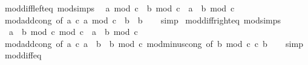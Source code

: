 \begin{isabellebody}
\ mod{\isacharunderscore}{\kern0pt}diff{\isacharunderscore}{\kern0pt}left{\isacharunderscore}{\kern0pt}eq\ {\isacharbrackleft}{\kern0pt}mod{\isacharunderscore}{\kern0pt}simps{\isacharbrackright}{\kern0pt}{\isacharcolon}{\kern0pt}\isanewline
\ \ {\isachardoublequoteopen}{\isacharparenleft}{\kern0pt}a\ mod\ c\ {\isacharminus}{\kern0pt}\ b{\isacharparenright}{\kern0pt}\ mod\ c\ {\isacharequal}{\kern0pt}\ {\isacharparenleft}{\kern0pt}a\ {\isacharminus}{\kern0pt}\ b{\isacharparenright}{\kern0pt}\ mod\ c{\isachardoublequoteclose}\isanewline
%
\isadelimproof
\ \ %
\endisadelimproof
%
\isatagproof
{}\isamarkupfalse%
\ mod{\isacharunderscore}{\kern0pt}add{\isacharunderscore}{\kern0pt}cong\ {\isacharbrackleft}{\kern0pt}of\ a\ c\ {\isachardoublequoteopen}a\ mod\ c{\isachardoublequoteclose}\ {\isachardoublequoteopen}{\isacharminus}{\kern0pt}\ b{\isachardoublequoteclose}\ {\isachardoublequoteopen}{\isacharminus}{\kern0pt}\ b{\isachardoublequoteclose}{\isacharbrackright}{\kern0pt}\isanewline
\ \ \isamarkupfalse%
\ simp%
\endisatagproof
{\isafoldproof}%
%
\isadelimproof
\isanewline
%
\endisadelimproof
\isanewline
{}\isamarkupfalse%
\ mod{\isacharunderscore}{\kern0pt}diff{\isacharunderscore}{\kern0pt}right{\isacharunderscore}{\kern0pt}eq\ {\isacharbrackleft}{\kern0pt}mod{\isacharunderscore}{\kern0pt}simps{\isacharbrackright}{\kern0pt}{\isacharcolon}{\kern0pt}\isanewline
\ \ {\isachardoublequoteopen}{\isacharparenleft}{\kern0pt}a\ {\isacharminus}{\kern0pt}\ b\ mod\ c{\isacharparenright}{\kern0pt}\ mod\ c\ {\isacharequal}{\kern0pt}\ {\isacharparenleft}{\kern0pt}a\ {\isacharminus}{\kern0pt}\ b{\isacharparenright}{\kern0pt}\ mod\ c{\isachardoublequoteclose}\isanewline
%
\isadelimproof
\ \ %
\endisadelimproof
%
\isatagproof
{}\isamarkupfalse%
\ mod{\isacharunderscore}{\kern0pt}add{\isacharunderscore}{\kern0pt}cong\ {\isacharbrackleft}{\kern0pt}of\ a\ c\ a\ {\isachardoublequoteopen}{\isacharminus}{\kern0pt}\ b{\isachardoublequoteclose}\ {\isachardoublequoteopen}{\isacharminus}{\kern0pt}\ {\isacharparenleft}{\kern0pt}b\ mod\ c{\isacharparenright}{\kern0pt}{\isachardoublequoteclose}{\isacharbrackright}{\kern0pt}\ mod{\isacharunderscore}{\kern0pt}minus{\isacharunderscore}{\kern0pt}cong\ {\isacharbrackleft}{\kern0pt}of\ {\isachardoublequoteopen}b\ mod\ c{\isachardoublequoteclose}\ c\ b{\isacharbrackright}{\kern0pt}\isanewline
\ \ \isamarkupfalse%
\ simp%
\endisatagproof
{\isafoldproof}%
%
\isadelimproof
\isanewline
%
\endisadelimproof
\isanewline
{}\isamarkupfalse%
\ mod{\isacharunderscore}{\kern0pt}diff{\isacharunderscore}{\kern0pt}eq{\isacharcolon}{\kern0pt}\isanewline

\end{isabellebody}
